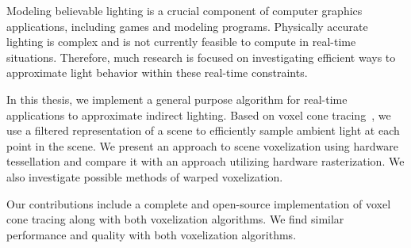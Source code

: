 Modeling believable lighting is a crucial component of computer graphics applications, including games and modeling programs. Physically accurate lighting is complex and is not currently feasible to compute in real-time situations. Therefore, much research is focused on investigating efficient ways to approximate light behavior within these real-time constraints.

In this thesis, we implement a general purpose algorithm for real-time applications to approximate indirect lighting. Based on voxel cone tracing~\cite{crassin2011interactive}, we use a filtered representation of a scene to efficiently sample ambient light at each point in the scene. We present an approach to scene voxelization using hardware tessellation and compare it with an approach utilizing hardware rasterization. We also investigate possible methods of warped voxelization.

Our contributions include a complete and open-source implementation of voxel cone tracing along with both voxelization algorithms. We find similar performance and quality with both voxelization algorithms.
